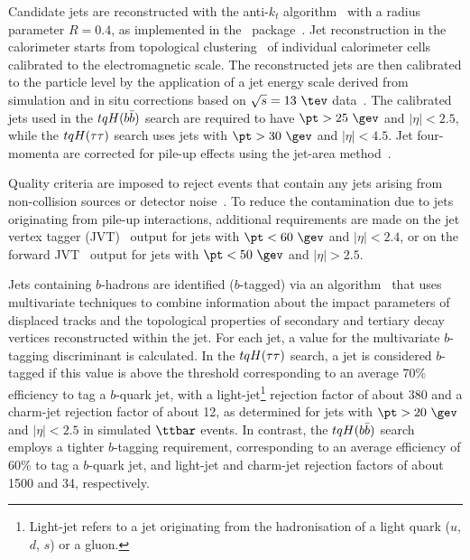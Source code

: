 Candidate jets are reconstructed with the anti-$k_t$ algorithm~\cite{Cacciari:2008gp,Cacciari:2005hq} with a
radius parameter $R=0.4$, as implemented in the \fastjet\ package~\cite{Cacciari:2011ma}.  
Jet reconstruction in the calorimeter starts from topological clustering~\cite{Aad:2016upy} of individual calorimeter cells calibrated to the electromagnetic scale. 
The reconstructed jets are then calibrated to the particle level by the application of a jet energy scale 
derived from simulation and in situ corrections based on $\sqrt{s}=13~\tev$ data~\cite{Aaboud:2017jcu}.
The calibrated jets used in the $tqH(b\bar{b})$ search are required to have $\pt > 25~\gev$ and $|\eta| < 2.5$,
while the $tqH(\tau\tau)$ search uses jets with $\pt > 30~\gev$ and $|\eta| < 4.5$.
Jet four-momenta are corrected for pile-up effects using the jet-area method~\cite{Cacciari:2008gn}.

Quality criteria are imposed to reject events that contain any jets arising from non-collision sources
or detector noise~\cite{ATLAS-CONF-2015-029}.  To reduce the contamination due to jets originating from pile-up interactions,
additional requirements are made on the jet vertex tagger (JVT)~\cite{Aad:2015ina} output for jets with $\pt<60~\gev$ and $|\eta| < 2.4$,
or on the forward JVT~\cite{Aaboud:2017pou} output for jets with $\pt<50~\gev$ and $|\eta| > 2.5$.

Jets containing $b$-hadrons are identified ($b$-tagged) via an algorithm~\cite{Aad:2015ydr,ATL-PHYS-PUB-2016-012} 
that uses multivariate techniques to combine information about the impact parameters of displaced tracks and the  topological properties 
of secondary and tertiary decay vertices reconstructed within the jet. For each jet, a value for the multivariate $b$-tagging discriminant is 
calculated. In the $tqH(\tau\tau)$ search, a jet is considered $b$-tagged if this value is above the threshold corresponding to
an average 70\% efficiency to tag a $b$-quark jet, with a light-jet\footnote{Light-jet refers to a jet originating from the hadronisation of a light quark 
($u$, $d$, $s$) or a gluon.} rejection factor of about 380 and a charm-jet rejection factor of about 12, as determined for jets with
$\pt >20~\gev$ and $|\eta|<2.5$ in simulated $\ttbar$ events. In contrast, the $tqH(b\bar{b})$ search employs a tighter $b$-tagging requirement, 
corresponding to an average efficiency of 60\% to tag a $b$-quark jet, and light-jet and charm-jet rejection factors of about 1500 and 34, respectively.


